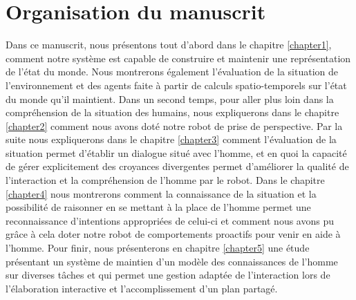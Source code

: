 \documentclass[a4paper,11pt,twoside]{StyleThese}
\begin{document}
	
 	


\section{Organisation du manuscrit}
Dans ce manuscrit, nous présentons tout d'abord dans le chapitre \ref{chapter1}, comment notre système est capable  de construire et maintenir une représentation de l'état du monde. Nous montrerons également l'évaluation de la situation de l'environnement et des agents faite à partir de calculs spatio-temporels sur l'état du monde qu'il maintient.
Dans un second temps, pour aller plus loin dans la compréhension de la situation des humains, nous expliquerons dans le chapitre \ref{chapter2} comment nous avons doté notre robot de prise de perspective.
Par la suite nous expliquerons dans le chapitre \ref{chapter3} comment l'évaluation de la situation permet d'établir un dialogue situé avec l'homme, et en quoi la capacité de gérer explicitement des croyances divergentes permet d'améliorer la qualité de l'interaction et la compréhension de l'homme par le robot.
Dans le chapitre \ref{chapter4} nous montrerons comment la connaissance de la situation et la possibilité de raisonner en se mettant à la place de l'homme permet une reconnaissance d'intentions appropriées de celui-ci et comment nous avons pu grâce à cela doter notre robot de comportements proactifs pour venir en aide à l'homme.
Pour finir, nous présenterons en chapitre \ref{chapter5} une étude présentant un système de maintien d'un modèle des connaissances de l'homme sur diverses tâches et qui permet une gestion adaptée de l'interaction lors de l'élaboration interactive et l'accomplissement d'un plan partagé.

\ifdefined{}
\else


\end{document}
